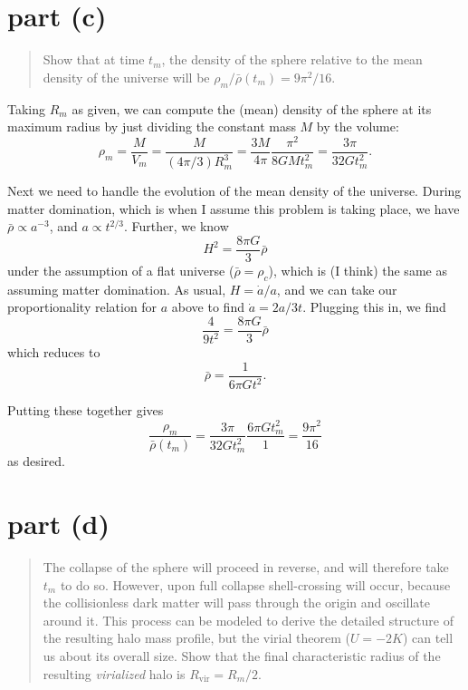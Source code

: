 \documentclass{article}
\begin{document}
\section*{part (c)}

\begin{quote}
	Show that at time $t_m$, the density of the sphere relative to the mean
	density of the universe will be $\rho_m / \bar \rho(t_m) = 9 \pi^2 /
	16$. 
\end{quote}

Taking $R_m$ as given, we can compute the (mean) density of the sphere at its
maximum radius by just dividing the constant mass $M$ by the volume:
\begin{equation}
	\rho_m
	= \frac{M}{V_m}
	= \frac{M}{ (4\pi/3) R_m^3 }
	= \frac{3 M}{4 \pi} \frac{\pi^2}{8 G M t_m^2}
	= \frac{3 \pi}{32 G t_m^2}.
\end{equation}

Next we need to handle the evolution of the mean density of the universe.
During matter domination, which is when I assume this problem is taking place, we have 
$\bar\rho \propto a^{-3}$, and $a \propto t^{2/3}$. Further, we know
\begin{equation}
	H^2 = \frac{8 \pi G}{3} \bar\rho
\end{equation}
under the assumption of a flat universe ($\bar\rho = \rho_c$), which is (I
think) the same as assuming matter domination. As usual, $H = \dot a/a$, and we
can take our proportionality relation for $a$ above to find $\dot a = 2 a / 3
t$. Plugging this in, we find
\begin{equation}
	\frac{4}{9t^2} = \frac{8 \pi G}{3} \bar\rho
\end{equation}
which reduces to
\begin{equation}
	\bar\rho = \frac{1}{6 \pi G t^2}.
	\label{eq:rho_bar}
\end{equation}

Putting these together gives
\begin{equation}
	\frac{\rho_m}{\bar\rho(t_m)}
	= \frac{3 \pi}{32 G t_m^2} \frac{6 \pi G t_m^2}{1}
	= \frac{9 \pi^2}{16}
\end{equation}
as desired.


\section*{part (d)}

\begin{quote}
	The collapse of the sphere will proceed in reverse, and will therefore
	take $t_m$ to do so. However, upon full collapse shell-crossing will
	occur, because the collisionless dark matter will pass through the
	origin and oscillate around it. This process can be modeled to derive
	the detailed structure of the resulting halo mass profile, but the
	virial theorem ($U = -2K$) can tell us about its overall size. Show
	that the final characteristic radius of the resulting
	\textit{virialized} halo is $R_\text{vir} = R_m/2$.
\end{quote}
\end{document}

